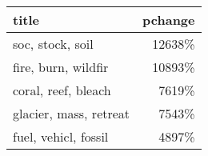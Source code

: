 \begin{tabular}{p{1.2cm}r}
\toprule
                  title &  pchange \\
\midrule
       soc, stock, soil &   12638\% \\
    fire, burn, wildfir &   10893\% \\
    coral, reef, bleach &    7619\% \\
 glacier, mass, retreat &    7543\% \\
   fuel, vehicl, fossil &    4897\% \\
\bottomrule
\end{tabular}

